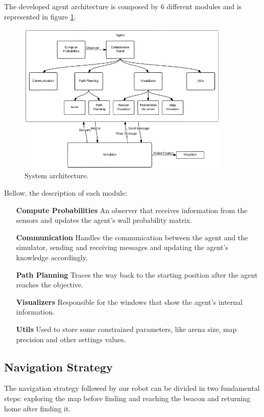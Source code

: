\documentclass[oribibl]{llncs}
\begin{document}
The developed agent architecture is composed by 6 different modules and is represented in figure \ref{fig:robot-arch}.

\begin{figure}
  \centering
  \includegraphics[width=0.9\textwidth]{robot-architecture.png}
  \caption{System architecture.}
  \label{fig:robot-arch}
\end{figure}

Bellow, the description of each module:

\begin{itemize}
  \item[\textbf{Compute Probabilities}]
  An observer that receives information from the sensors and updates the agent's
wall probability matrix.
  \item[\textbf{Communication}]
  Handles the communication between the agent and the simulator, sending and receiving messages and updating the agent's knowledge accordingly. 
  \item[\textbf{Path Planning}]
  Traces the way back to the starting position after the agent reaches the objective.
  \item[\textbf{Visualizers}]
  Responsible for the windows that show the agent's internal information.
  \item[\textbf{Utils}]
  Used to store some constrained parameters, like arena size, map precision and other settings values.
\end{itemize}

\subsection{Navigation Strategy}
The navigation strategy followed by our robot can be divided in two fundamental steps: exploring the map before finding and reaching the beacon and returning home after finding it.
\end{document}
